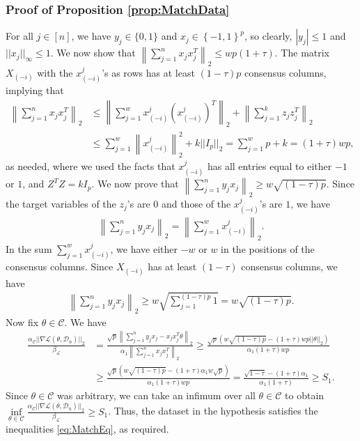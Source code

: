 \documentclass{article}
\begin{document}

\subsubsection{Proof of Proposition \ref{prop:MatchData}}
\label{AppPropMatch}

For all $j \in [n]$, we have $y_j \in \{0, 1\}$ and $x_j \in \left\{-1, 1\right\}^p$, so clearly, $|y_j| \leq 1$ and $||x_j||_{\infty} \leq 1$. We now show that $\left\|\sum_{j = 1}^n x_jx_j^T\right\|_2 \leq wp(1 + \tau)$. The matrix $X_{(-i)}$ with the $x^j_{(-i)}$'s as rows has at least $(1 - \tau)p$ consensus columns, implying that
\begin{align*}
\left\|\sum_{j = 1}^n x_jx_j^T\right\|_2 &\leq \left\|\sum_{j = 1}^w x^j_{(-i)} (x^j_{(-i)})^T\right\|_2 + \left\|\sum_{j = 1}^k z_jz_j^T\right\|_2\\
&\leq \sum_{j = 1}^w\left\|x^j_{(-i)}\right\|_2^2 + k||I_p||_2 = \sum_{j = 1}^w p + k = (1 + \tau)wp,
\end{align*}
as needed, where we used the facts that $x^j_{(-i)}$ has all entries equal to either $-1$ or $1$, and $Z^TZ = kI_p$. We now prove that $\left\|\sum_{j = 1}^n y_jx_j\right\|_2 \geq w\sqrt{(1 - \tau)p}$. Since the target variables of the $z_j$'s are $0$ and those of the $x^j_{(-i)}$'s are $1$, we have
\begin{align*}
\left\|\sum_{j = 1}^n y_jx_j\right\|_2 = \left\|\sum_{j = 1}^w x^j_{(-i)}\right\|_2.
\end{align*}
In the sum $\sum_{j = 1}^w x^j_{(-i)}$, we have either $-w$ or $w$ in the positions of the consensus columns. Since $X_{(-i)}$ has at least $(1 - \tau)$ consensus columns, we have
\begin{align*}
\left\|\sum_{j = 1}^n y_jx_j\right\|_2 \geq w\sqrt{\sum_{j = 1}^{(1 - \tau)p} 1} = w\sqrt{(1 - \tau)p}. 
\end{align*}
Now fix $\theta \in \mathcal{C}$. We have 
\begin{align*}
\frac{\alpha_{\mathcal{C}}||\nabla \mathcal{L}(\theta, \mathcal{D}_n)||_2}{\beta_{\mathcal{L}}} &= \frac{\sqrt{p}\left\|\sum_{j = 1}^ny_jx_j - x_jx_j^T\theta\right\|_2}{\alpha_1\left\|\sum_{j = 1}^nx_jx_j^T\right\|_2} \geq \frac{\sqrt{p}\left(w\sqrt{(1 - \tau)p} - (1 + \tau)wp||\theta||_2\right)}{\alpha_1(1 + \tau)wp}\\
&\geq \frac{\sqrt{p}\left(w\sqrt{(1 - \tau)p} - (1 + \tau)\alpha_1w\sqrt{p}\right)}{\alpha_1(1 + \tau)wp} = \frac{\sqrt{1 - \tau} - (1 + \tau)\alpha_1}{\alpha_1(1 + \tau)} \geq S_1.
\end{align*}
Since $\theta \in \mathcal{C}$ was arbitrary, we can take an infimum over all $\theta \in \mathcal{C}$ to obtain $\mathop{\inf}\limits_{\theta \in \mathcal{C}}\frac{\alpha_{\mathcal{C}}||\nabla \mathcal{L}(\theta, \mathcal{D}_n)||_2}{\beta_{\mathcal{L}}} \geq S_1$. Thus, the dataset in the hypothesis satisfies the inequalities \eqref{eq:MatchEq}, as required.
\end{document}
